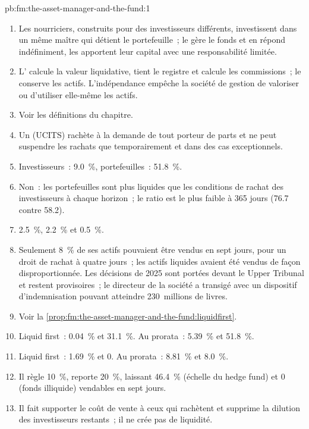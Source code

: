 \begin{solution}{pb:fm:the-asset-manager-and-the-fund:1}
\begin{enumerate}
\item Les nourriciers, construits pour des investisseurs différents, investissent dans un même maître qui détient le portefeuille~; le  gère le fonds et en répond indéfiniment, les
 apportent leur capital avec une responsabilité limitée.
\item L' calcule la valeur liquidative, tient le registre et calcule les commissions~; le  conserve les actifs. L'indépendance empêche la société de gestion
de valoriser ou d'utiliser elle-même les actifs.
\item Voir les définitions du chapitre.
\item Un  (UCITS) rachète à la demande de tout porteur de parts et ne peut suspendre les rachats que temporairement et dans des cas exceptionnels.
\item Investisseurs~: 9.0~\%, portefeuilles~: 51.8~\%.
\item Non~: les portefeuilles sont plus liquides que les conditions de rachat des investisseurs à chaque horizon~; le ratio est le plus faible à 365 jours (76.7 contre 58.2).
\item 2.5~\%, 2.2~\% et 0.5~\%.
\item Seulement 8~\% de ses actifs pouvaient être vendus en sept jours, pour un droit de rachat à quatre jours~; les actifs liquides avaient été vendus de façon disproportionnée.
Les décisions de 2025 sont portées devant le Upper Tribunal et restent provisoires~; le directeur de la société a transigé avec un dispositif d'indemnisation pouvant atteindre 230~millions de livres.
\item Voir la \cref{prop:fm:the-asset-manager-and-the-fund:liquidfirst}.
\item Liquid first~: 0.04~\% et 31.1~\%. Au prorata~: 5.39~\% et 51.8~\%.
\item Liquid first~: 1.69~\% et 0. Au prorata~: 8.81~\% et 8.0~\%.
\item Il règle 10~\%, reporte 20~\%, laissant 46.4~\% (échelle du hedge fund) et 0 (fonds illiquide) vendables en sept jours.
\item Il fait supporter le coût de vente à ceux qui rachètent et supprime la dilution des investisseurs restants~; il ne crée pas de liquidité.

\end{enumerate}
\end{solution}
